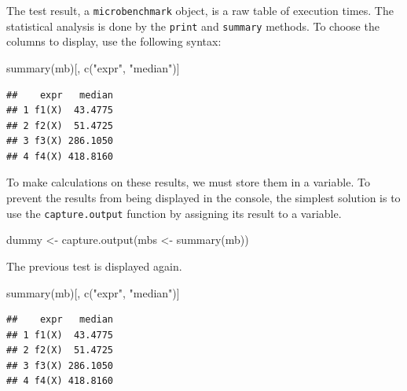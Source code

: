 \documentclass[
  12pt,
  american,
  a4paper,
  extrafontsizes,onecolumn,openright
  ]{memoir}
\newenvironment{Shaded}{\begin{snugshade}}{\end{snugshade}}
\newcommand{\FunctionTok}[1]{\textcolor[rgb]{0.00,0.00,0.00}{#1}}
\newcommand{\NormalTok}[1]{#1}
\newcommand{\OtherTok}[1]{\textcolor[rgb]{0.56,0.35,0.01}{#1}}
\newcommand{\StringTok}[1]{\textcolor[rgb]{0.31,0.60,0.02}{#1}}
\begin{document}
The test result, a \texttt{microbenchmark} object, is a raw table of execution times.
The statistical analysis is done by the \texttt{print} and \texttt{summary} methods.
To choose the columns to display, use the following syntax:

\scriptsize

\begin{Shaded}
\begin{Highlighting}[]
\FunctionTok{summary}\NormalTok{(mb)[, }\FunctionTok{c}\NormalTok{(}\StringTok{"expr"}\NormalTok{, }\StringTok{"median"}\NormalTok{)]}
\end{Highlighting}
\end{Shaded}

\begin{verbatim}
##    expr   median
## 1 f1(X)  43.4775
## 2 f2(X)  51.4725
## 3 f3(X) 286.1050
## 4 f4(X) 418.8160
\end{verbatim}

\normalsize

To make calculations on these results, we must store them in a variable.
To prevent the results from being displayed in the console, the simplest solution is to use the \texttt{capture.output} function by assigning its result to a variable.

\scriptsize

\begin{Shaded}
\begin{Highlighting}[]
\NormalTok{dummy }\OtherTok{\textless{}{-}} \FunctionTok{capture.output}\NormalTok{(mbs }\OtherTok{\textless{}{-}} \FunctionTok{summary}\NormalTok{(mb))}
\end{Highlighting}
\end{Shaded}

\normalsize

The previous test is displayed again.

\scriptsize

\begin{Shaded}
\begin{Highlighting}[]
\FunctionTok{summary}\NormalTok{(mb)[, }\FunctionTok{c}\NormalTok{(}\StringTok{"expr"}\NormalTok{, }\StringTok{"median"}\NormalTok{)]}
\end{Highlighting}
\end{Shaded}

\begin{verbatim}
##    expr   median
## 1 f1(X)  43.4775
## 2 f2(X)  51.4725
## 3 f3(X) 286.1050
## 4 f4(X) 418.8160
\end{verbatim}
\end{document}
